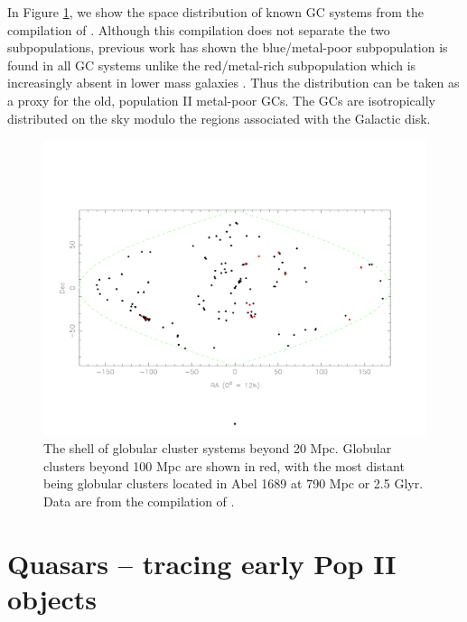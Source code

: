 \documentclass[]{pasa}
\begin{document}
In Figure \ref{fig:gc}, we show the space distribution of known GC systems from the compilation of \cite{Harris2013}. Although this compilation does not separate the two subpopulations, previous work has shown the blue/metal-poor subpopulation is found in all GC systems unlike the red/metal-rich subpopulation which is increasingly absent in lower mass galaxies \cite{Peng2006}. Thus the distribution can be taken as a proxy for the old, population II metal-poor GCs. 
The GCs are isotropically distributed on the sky modulo the regions associated with the Galactic disk. 
%



\begin{figure}
\includegraphics[scale=0.7,]{gc1}
\caption{\label{fig:gc}
The shell of globular cluster systems beyond 20 Mpc. Globular clusters
beyond 100 Mpc are shown in red, with the most distant being globular clusters located in Abel 1689 at 790 Mpc or 2.5 Glyr.
 Data are from the compilation of \citet{Harris2013}.}
\end{figure}

\section{Quasars  -- tracing early Pop II objects} \label{sec:qso}
\end{document}
